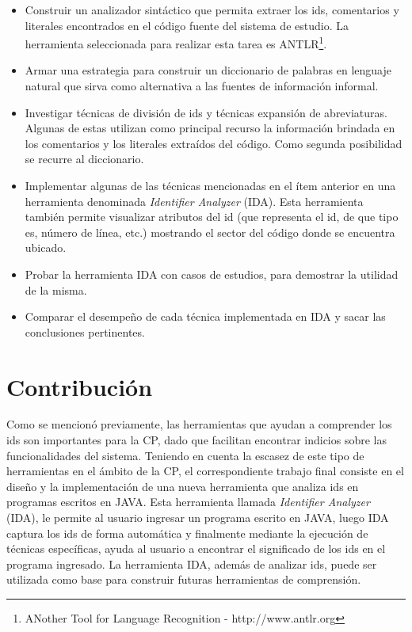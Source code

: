 \begin{itemize}
\itemsep0em%
\item Construir un analizador sintáctico que permita extraer los ids, comentarios y literales encontrados en el código fuente del sistema de estudio. La herramienta seleccionada para realizar esta tarea es ANTLR\footnote[1]{ANother Tool for Language Recognition - http://www.antlr.org}.

\item Armar una estrategia para construir un diccionario de palabras en lenguaje natural que sirva como alternativa a las fuentes de información informal.

\item Investigar técnicas de división de ids y técnicas expansión de abreviaturas. Algunas de estas utilizan como principal recurso la información brindada en los comentarios y los literales extraídos del código. Como segunda posibilidad se recurre al diccionario.

\item Implementar algunas de las técnicas mencionadas en el ítem anterior en una herramienta denominada \textit{Identifier Analyzer} (IDA). Esta herramienta también permite visualizar atributos del id (que representa el id, de que tipo es, número de línea, etc.) mostrando el sector del código donde se encuentra ubicado.

\item Probar la herramienta IDA con casos de estudios, para demostrar la utilidad de la misma.

\item Comparar el desempeño de cada técnica implementada en IDA y sacar las conclusiones pertinentes.

\end{itemize}

\pagebreak 
\section{Contribución}

Como se mencionó previamente, las herramientas que ayudan a comprender los ids son importantes para la CP, dado que facilitan encontrar indicios sobre las funcionalidades del sistema.
Teniendo en cuenta la escasez de este tipo de herramientas en el ámbito de la CP, el correspondiente trabajo final consiste en el diseño y la implementación de una nueva herramienta que analiza ids en programas escritos en JAVA. Esta herramienta llamada \textit{Identifier Analyzer} (IDA), le permite al usuario ingresar un programa escrito en \mbox{JAVA}, luego IDA captura los ids de forma automática y finalmente mediante la ejecución de técnicas específicas, ayuda al usuario a encontrar el significado de los ids en el programa ingresado. 
La herramienta IDA, además de analizar ids, puede ser utilizada como base para construir futuras herramientas de comprensión.

